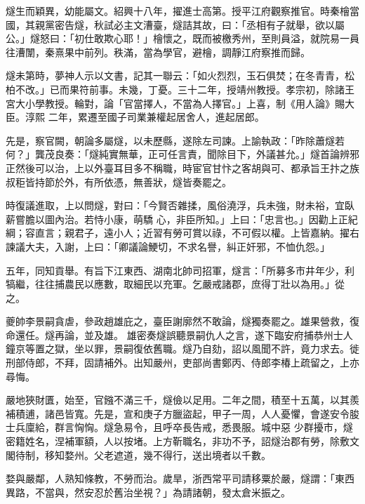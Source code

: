 \begin{pinyinscope}
 燧生而穎異，幼能屬文。紹興十八年，擢進士高第。授平江府觀察推官。時秦檜當
 國，其親黨密告燧，秋試必主文漕臺，燧詰其故，曰：「丞相有子就舉，欲以屬公。」燧怒曰：「初仕敢欺心耶！」檜懷之，既而被檄秀州，至則員溢，就院易一員往漕闈，秦熹果中前列。秩滿，當為學官，避檜，調靜江府察推而歸。



 燧未第時，夢神人示以文書，記其一聯云：「如火烈烈，玉石俱焚；在冬青青，松柏不改。」已而果符前事。未幾，丁憂。三十二年，授靖州教授。孝宗初，除諸王宮大小學教授。輪對，論「官當擇人，不當為人擇官。」上喜，制《用人論》賜大臣。淳熙
 二年，累遷至國子司業兼權起居舍人，進起居郎。



 先是，察官闕，朝論多屬燧，以未歷縣，遂除左司諫。上諭執政：「昨除蕭燧若何？」龔茂良奏：「燧純實無華，正可任言責，聞除目下，外議甚允。」燧首論辨邪正然後可以治，上以外臺耳目多不稱職，時宦官甘忭之客胡與可、都承旨王抃之族叔秬皆持節於外，有所依憑，無善狀，燧皆奏罷之。



 時復議進取，上以問燧，對曰：「今賢否雜揉，風俗澆浮，兵未強，財未裕，宜臥薪嘗膽以圖內治。若恃小康，萌驕
 心，非臣所知。」上曰：「忠言也。」因勸上正紀綱；容直言；親君子，遠小人；近習有勞可賞以祿，不可假以權。上皆嘉納。擢右諫議大夫，入謝，上曰：「卿議論鯁切，不求名譽，糾正奸邪，不恤仇怨。」



 五年，同知貢舉。有旨下江東西、湖南北帥司招軍，燧言：「所募多市井年少，利犒繼，往往捕農民以應數，取細民以充軍。乞嚴戒諸郡，庶得丁壯以為用。」從之。



 夔帥李景嗣貪虐，參政趙雄庇之，臺臣謝廓然不敢論，燧獨奏罷之。雄果營救，復命還任。燧再論，並及雄。
 雄密奏燧誤聽景嗣仇人之言，遂下臨安府捕恭州士人鐘京等置之獄，坐以罪，景嗣復依舊職。燧乃自劾，詔以風聞不許，竟力求去。徙刑部侍郎，不拜，固請補外。出知嚴州，吏部尚書鄭丙、侍郎李椿上疏留之，上亦尋悔。



 嚴地狹財匱，始至，官鏹不滿三千，燧儉以足用。二年之間，積至十五萬，以其羨補積逋，諸邑皆寬。先是，宣和庚子方臘盜起，甲子一周，人人憂懼，會遂安令朘士兵廩給，群言恟恟。燧急易令，且呼卒長告戒，悉畏服。城中惡
 少群擾市，燧密籍姓名，涅補軍額，人以按堵。上方靳職名，非功不予，詔燧治郡有勞，除敷文閣待制，移知婺州。父老遮道，幾不得行，送出境者以千數。



 婺與嚴鄰，人熟知條教，不勞而治。歲旱，浙西常平司請移粟於嚴，燧謂：「東西異路，不當與，然安忍於舊治坐視？」為請諸朝，發太倉米振之。




\end{pinyinscope}

